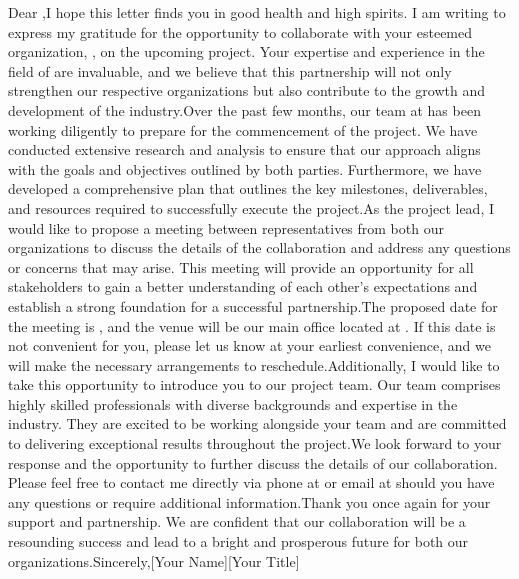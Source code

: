 Dear ,I hope this letter finds you in good health and high spirits. I am writing to express my gratitude for the opportunity to collaborate with your esteemed organization, , on the upcoming  project. Your expertise and experience in the field of  are invaluable, and we believe that this partnership will not only strengthen our respective organizations but also contribute to the growth and development of the  industry.Over the past few months, our team at  has been working diligently to prepare for the commencement of the project. We have conducted extensive research and analysis to ensure that our approach aligns with the goals and objectives outlined by both parties. Furthermore, we have developed a comprehensive plan that outlines the key milestones, deliverables, and resources required to successfully execute the project.As the project lead, I would like to propose a meeting between representatives from both our organizations to discuss the details of the collaboration and address any questions or concerns that may arise. This meeting will provide an opportunity for all stakeholders to gain a better understanding of each other's expectations and establish a strong foundation for a successful partnership.The proposed date for the meeting is , and the venue will be our main office located at . If this date is not convenient for you, please let us know at your earliest convenience, and we will make the necessary arrangements to reschedule.Additionally, I would like to take this opportunity to introduce you to our project team. Our team comprises highly skilled professionals with diverse backgrounds and expertise in the  industry. They are excited to be working alongside your team and are committed to delivering exceptional results throughout the project.We look forward to your response and the opportunity to further discuss the details of our collaboration. Please feel free to contact me directly via phone at  or email at  should you have any questions or require additional information.Thank you once again for your support and partnership. We are confident that our collaboration will be a resounding success and lead to a bright and prosperous future for both our organizations.Sincerely,[Your Name][Your Title]